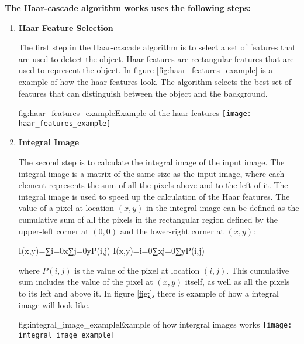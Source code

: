         \textbf{The Haar-cascade algorithm works uses the following steps:}
        \begin{enumerate}
            
            \item \textbf{Haar Feature Selection}
        
            The first step in the Haar-cascade algorithm is to select a set of features that are used to detect the object. 
            Haar features are rectangular features that are used to represent the object. In figure \ref{fig:haar_features_example} is a example of how the haar features look. 
            The algorithm selects the best set of features that can distinguish between the object and the background.

            \begin{linfigure}{fig:haar_features_example}{Example of the haar features}
                \texttt{[image: haar\_features\_example]}
            \end{linfigure}
                
            \item \textbf{Integral Image}
        
            The second step is to calculate the integral image of the input image. The integral image is a matrix of the same size as the input image, where each element represents the sum of all the pixels above and to the left of it. 
            The integral image is used to speed up the calculation of the Haar features. 
            The value of a pixel at location $(x,y)$ in the integral image can be defined as the cumulative sum of all the pixels in the rectangular region defined by the upper-left corner at $(0,0)$ and the lower-right corner at $(x,y)$:
            
            I(x,y)=∑i=0x∑j=0yP(i,j)
            I(x,y)=i=0∑x​j=0∑y​P(i,j)
            
            where $P(i,j)$ is the value of the pixel at location $(i,j)$. This cumulative sum includes the value of the pixel at $(x,y)$ itself, as well as all the pixels to its left and above it.
            In figure \ref{fig:}, there is example of how a integral image will look like.

            \begin{linfigure}{fig:integral_image_example}{Example of how intergral images works}
                \texttt{[image: integral\_image\_example]}
            \end{linfigure}
            

\end{enumerate}
